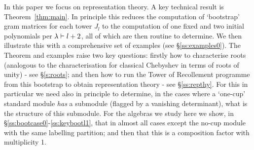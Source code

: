 In this paper we 
focus on representation theory. 
A key technical result is Theorem~\ref{thm:main}.
In principle this reduces the computation of 
`bootstrap' 
gram matrices for each tower $J_l$ 
to the computation of one fixed and two initial polynomials per $\lambda\vdash l+2$, 
all of which are then routine to determine. 
We then illustrate this with a comprehensive set of examples (see \S\ref{ss:examples0}). 
The Theorem and examples raise two key questions: 
firstly how to characterise roots (analogous to the characterisation for classical 
Chebyshev in terms of roots of unity) - see \S\ref{s:roots};
and then how to run the Tower of Recollement programme from this bootstrap to obtain representation theory
- see \S\ref{ss:repthy}. 
For this in particular we need also in principle to determine, in the cases where a `one-cup' standard module {\em has} a submodule (flagged by a vanishing determinant), 
what is the structure of this submodule. 
For the algebras we study here we show, in \S\ref{ss:bootcase0}-\ref{ss:keybootl1}, that 
in almost all cases 
 except the no-cup module with the same labelling partition; and then that this 
is a composition factor with multiplicity 1. 


